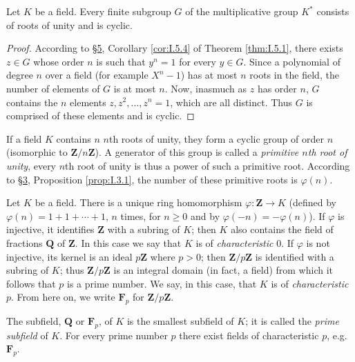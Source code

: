 
\begin{theorem}
\label{thm:I.6.1}
Let $K$ be a field. Every finite subgroup $G$ of the multiplicative group
$K^{*}$ consists of roots of unity and is cyclic.
\end{theorem}

\begin{proof}
According to \hyperref[sec:1.5]{§5}, Corollary \ref{cor:I.5.4} of Theorem \ref{thm:I.5.1},
there exists $z\in G$ whose order $n$ is such that $y^{n}=1$ for every
$y\in G$. Since a polynomial of degree $n$ over a field (for example
$X^{n}-1$) has at most $n$ roots in the field, the number of elements of
$G$ is at most $n$. Now, inasmuch as $z$ has order $n$, $G$ contains the
$n$ elements $z,z^{2},\ldots,z^{n}=1$, which are all distinct. Thus $G$ is
comprised of these elements and is cyclic.
\end{proof}

If a field $K$ contains $n$ $n$th roots of unity, they form a cyclic group of
order $n$ (isomorphic to $\mathbf{Z}/n\mathbf{Z}$). A generator of this
group is called a \emph{primitive $n$th root of unity}, every $n$th root of
unity is thus a power of such a primitive root. According to \hyperref[sec:1.3]{§3},
Proposition \ref{prop:I.3.1}, the number of these primitive roots is
$\varphi(n)$.


Let $K$ be a field. There is a unique ring homomorphism $\varphi:
\mathbf{Z}\to K$ (defined by $\varphi(n)=1+1+\cdots+1$, $n$ times, for
$n\geq0$ and by $\varphi(-n)=-\varphi(n)$). If $\varphi$ is injective, it
identifies $\mathbf{Z}$ with a subring of $K$; then $K$ also contains the
field of fractions $\mathbf{Q}$ of $\mathbf{Z}$. In this case we say that
$K$ is of \emph{characteristic} $0$. If $\varphi$ is not injective, its
kernel is an ideal $p\mathbf{Z}$ where $p>0$; then $\mathbf{Z}/p\mathbf{Z}$
is identified with a subring of $K$; thus $\mathbf{Z}/p\mathbf{Z}$ is an
integral domain (in fact, a field) from which it follows that $p$ is a prime
number. We say, in this case, that $K$ is of \emph{characteristic} $p$.
From here on, we write $\mathbf{F}_{p}$ for $\mathbf{Z}/p\mathbf{Z}$.

The subfield, $\mathbf{Q}$ or $\mathbf{F}_{p}$, of $K$ is the smallest
subfield of $K$; it is called the \emph{prime subfield} of $K$. For every
prime number $p$ there exist fields of characteristic $p$, e.g.\
$\mathbf{F}_{p}$.

